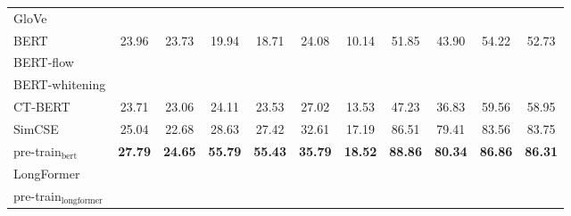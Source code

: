 \begin{tabular}{l|cccccccccc}
GloVe    &  &    &  &    &  &     &  &      &  &  \\
BERT      &23.96  &23.73    &19.94  &18.71    &24.08  &10.14     &51.85  &43.90      &54.22  &52.73 \\
BERT-flow      &  &    &  &    & &  & &   &  & \\
BERT-whitening      &  &    & &    & &  & &   &  & \\
CT-BERT      &23.71  &23.06    &24.11  &23.53    &27.02  &13.53     &47.23  &36.83      &59.56  &58.95   \\
SimCSE      &25.04  &22.68    &28.63  &27.42    &32.61  &17.19     &86.51  &79.41      &83.56  &83.75    \\
pre-train$_{\mathrm{bert}}$ &\textbf{27.79}  &\textbf{24.65}    &\textbf{55.79}  &\textbf{55.43}    &\textbf{35.79}  & \textbf{18.52}    &\textbf{88.86}  &\textbf{80.34}      &\textbf{86.86}  &\textbf{86.31}   \\
LongFormer  &  &    &  &    &  &     &  &      &  &  \\
pre-train$_{\mathrm{longformer}}$  &  &    &  &    &  &     &  &      &  &  \\
\bottomrule
\end{tabular}
